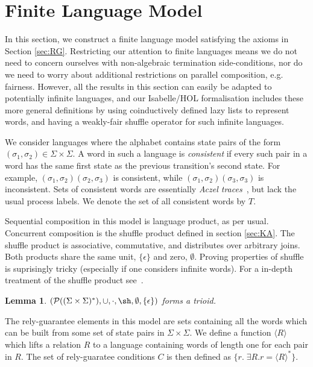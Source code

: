 \documentclass{llncs}
\DeclareMathOperator{\sha}{\sh}
\newtheorem{lem}{Lemma}
\begin{document}
\section{Finite Language Model}
\label{sec:Model}

In this section, we construct a finite language model satisfying the
axioms in Section \ref{sec:RG}. Restricting our attention to finite
languages means we do not need to concern ourselves with non-algebraic
termination side-conditions, nor do we need to worry about additional
restrictions on parallel composition, e.g. fairness. However, all the
results in this section can easily be adapted to potentially
infinite languages, and our Isabelle/HOL formalisation includes these more
general definitions by using coinductively defined lazy lists to
represent words, and having a weakly-fair shuffle operator for such
infinite languages.

We consider languages where the alphabet contains state pairs of the
form $(\sigma_1,\sigma_2) \in \Sigma \times \Sigma$. A word in such a
language is \emph{consistent} if every such pair in a word has the
same first state as the previous transition's second state. For
example, $(\sigma_1,\sigma_2)(\sigma_2,\sigma_3)$ is consistent, while
$(\sigma_1,\sigma_2)(\sigma_3,\sigma_3)$ is inconsistent. Sets of
consistent words are essentially \emph{Aczel
  traces}~\cite{boer_formal_1999}, but lack the usual process
labels. We denote the set of all consistent words by $T$.

Sequential composition in this model is language product, as per
usual. Concurrent composition is the shuffle product defined in
section \ref{sec:KA}. The shuffle product is associative, commutative,
and distributes over arbitrary joins. Both products share the same
unit, $\{\epsilon\}$ and zero, $\emptyset$. Proving properties of
shuffle is suprisingly tricky (especially if one considers infinite
words). For a in-depth treatment of the shuffle product
see~\cite{mateescu_shuffle-like_1997}.

\begin{lem}
$(\mathcal{P}((\Sigma\times\Sigma)^*), \cup, \cdot,\sha, \emptyset,
  \{\epsilon\})$ forms a trioid.
\end{lem}

The rely-guarantee elements in this model are sets containing all the
words which can be built from some set of state pairs in
$\Sigma\times\Sigma$. We define a function $\langle R\rangle$ which
lifts a relation $R$ to a language containing words of length one for
each pair in $R$. The set of rely-guaratee conditions $C$ is then defined
as $\{r.\; \exists R. r = \langle R\rangle^*\}$.
\end{document}
